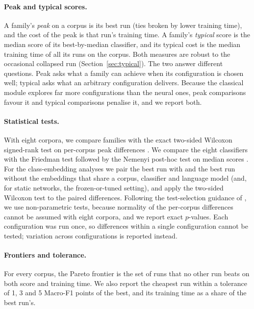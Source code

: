 \documentclass{ijis}
\begin{document}
\paragraph{Peak and typical scores.} A family's \emph{peak} on a corpus is its best run (ties broken by lower training time), and the cost of the peak is that run's training time. A family's \emph{typical} score is the median score of its best-by-median classifier, and its typical cost is the median training time of all its runs on the corpus. Both measures are robust to the occasional collapsed run (Section~\ref{sec:typical}). The two answer different questions. Peak asks what a family can achieve when its configuration is chosen well; typical asks what an arbitrary configuration delivers. Because the classical module explores far more configurations than the neural ones, peak comparisons favour it and typical comparisons penalise it, and we report both.

\paragraph{Statistical tests.} With eight corpora, we compare families with the exact two-sided Wilcoxon signed-rank test on per-corpus peak differences \cite{wilcoxon1945individual,demsar2006statistical}. We compare the eight classifiers with the Friedman test \cite{friedman1937use} followed by the Nemenyi post-hoc test on median scores \cite{demsar2006statistical}. For the class-embedding analyses we pair the best run with and the best run without the embeddings that share a corpus, classifier and language model (and, for static networks, the frozen-or-tuned setting), and apply the two-sided Wilcoxon test to the paired differences. Following the test-selection guidance of \cite{dror2018hitchhiker}, we use non-parametric tests, because normality of the per-corpus differences cannot be assumed with eight corpora, and we report exact $p$-values. Each configuration was run once, so differences within a single configuration cannot be tested; variation across configurations is reported instead.

\paragraph{Frontiers and tolerance.} For every corpus, the Pareto frontier is the set of runs that no other run beats on both score and training time. We also report the cheapest run within a tolerance of 1, 3 and 5 Macro-F1 points of the best, and its training time as a share of the best run's.
\end{document}
